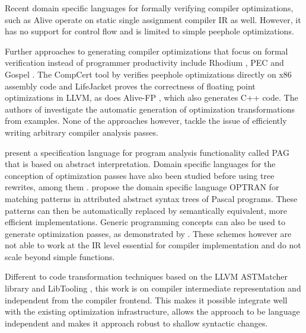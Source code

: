     Recent domain specific languages for formally verifying compiler
    optimizations, such as Alive \citep{Lopes:2015:PCP:2737924.2737965} operate
    on static single assignment compiler IR as well.
    However, it has no support for control flow and is limited to simple
    peephole optimizations.

    Further approaches to generating compiler optimizations that focus on formal
    verification instead of programmer productivity include Rhodium
    \citep{Lerner:2005:ASP:1040305.1040335}, PEC
    \citep{Kundu:2009:POC:1543135.1542513} and Gospel
    \citep{Whitfield:1997:AEC:267959.267960}.
    The CompCert tool by \citet{Mullen:2016:VPO:2908080.2908109} verifies
    peephole optimizations directly on x86 assembly code and LifeJacket
    \cite{Notzli:2016:LVP:2931021.2931024} proves the correctness of floating
    point optimizations in LLVM, as does Alive-FP \cite{Menendez2016}, which
    also generates C++ code.
    The authors of \cite{Tate:2010:GCO:1706299.1706345} investigate the
    automatic generation of optimization transformations from examples.
    None of the approaches however, tackle the issue of efficiently writing
    arbitrary compiler analysis passes.

    \citet{Martin1998} present a specification language for program analysis
    functionality called PAG that is based on abstract interpretation.
    Domain specific languages for the conception of optimization passes have
    also been studied before using tree rewrites, among them
    \citet{Olmos:2005:CSD:2136624.2136643}.
    \citet{Lipps1989} propose the domain specific language OPTRAN for matching
    patterns in attributed abstract syntax trees of Pascal programs.
    These patterns can then be automatically replaced by semantically
    equivalent, more efficient implementations. 
    Generic programming
    concepts can also be used to generate optimization passes, as
    demonstrated by \cite{Willcock:2009:RGP:1621607.1621611}.  These
    schemes however are not able to work at the IR level essential for
    compiler implementation and do not scale beyond simple functions.

    Different to code transformation techniques based on the LLVM ASTMatcher
    library and LibTooling \citep{be0fa11ddb194bde86a9dab8589b779c}, this work
    is on compiler intermediate representation and independent from
    the compiler frontend.
    This makes it possible integrate well with the existing optimization
    infrastructure, allows the approach to be language independent and makes it
    approach robust to shallow syntactic changes.

